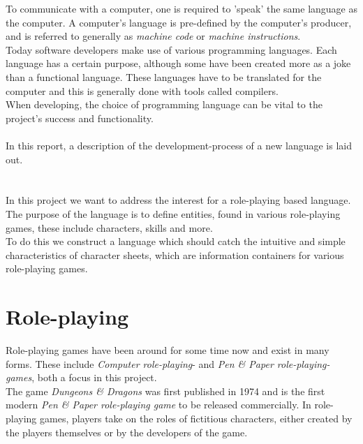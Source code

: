 
To communicate with a computer, one is required to 'speak' the same language as the computer. A computer's language is pre-defined by the computer's producer, and is referred to generally as \emph{machine code} or \emph{machine instructions}.\\
Today software developers make use of various programming languages. Each language has a certain purpose, although some have been created more as a joke than a functional language. These languages have to be translated for the computer and this is generally done with tools called compilers.\\
When developing, the choice of programming language can be vital to the project's success and functionality.\\\\
In this report, a description of the development-process of a new language is laid out.

\section{\langname{}}
In this project we want to address the interest for a role-playing based language. The purpose of the language is to define entities, found in various role-playing games, these include characters, skills and more.\\
To do this we construct a language which should catch the intuitive and simple characteristics of character sheets, which are information containers for various role-playing games.

\section{Role-playing}
Role-playing games have been around for some time now and exist in many forms.
These include \emph{Computer role-playing}- and \emph{Pen \& Paper role-playing-games}, both a focus in this project.\\
The game \emph{Dungeons \& Dragons} was first published in 1974 and is the first modern \emph{Pen \& Paper role-playing game} to be released commercially.\cite{wikidnd}
In role-playing games, players take on the roles of fictitious characters, either created by the players themselves or by the developers of the game.
